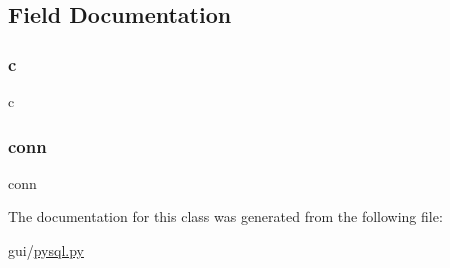\subsection{Field Documentation}
\mbox{\label{classpysql_1_1dibasql_ae0323a9039add2978bf5b49550572c7c}} 
\subsubsection{\texorpdfstring{c}{c}}
{\footnotesize\ttfamily c}

\mbox{\label{classpysql_1_1dibasql_a3d71ee93207c462b1690738e98283208}} 
\subsubsection{\texorpdfstring{conn}{conn}}
{\footnotesize\ttfamily conn}



The documentation for this class was generated from the following file\+:\begin{DoxyCompactItemize}
\item 
gui/\hyperlink{pysql_8py}{pysql.\+py}\end{DoxyCompactItemize}
